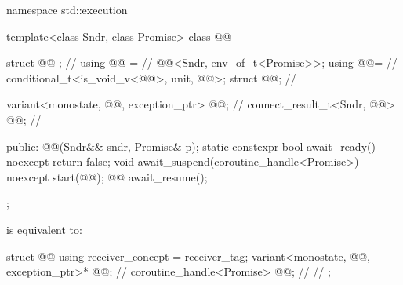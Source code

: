 \begin{codeblock}
namespace std::execution {
  template<class Sndr, class Promise>
  class @@ {
    struct @@ {};                                             // \expos
    using @@ =                                          // \expos
      @@<Sndr, env_of_t<Promise>>;
    using @@=                                         // \expos
      conditional_t<is_void_v<@@>, unit, @@>;
    struct @@;                                  // \expos

    variant<monostate, @@, exception_ptr> @@{};    // \expos
    connect_result_t<Sndr, @@> @@;           // \expos

  public:
    @@(Sndr&& sndr, Promise& p);
    static constexpr bool await_ready() noexcept { return false; }
    void await_suspend(coroutine_handle<Promise>) noexcept { start(@@); }
    @@ await_resume();
  };
}
\end{codeblock}

\pnum
{} is equivalent to:
\begin{codeblock}
struct @@ {
  using receiver_concept = receiver_tag;
  variant<monostate, @@, exception_ptr>* @@;   // \expos
  coroutine_handle<Promise> @@;                       // \expos
  // \seebelow
};
\end{codeblock}

